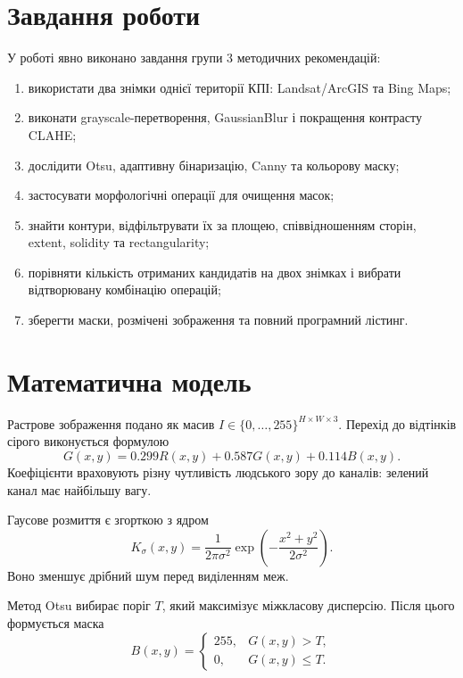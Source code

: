 \documentclass[12pt,a4paper]{article}
\begin{document}
\section{Завдання роботи}
У роботі явно виконано завдання групи 3 методичних рекомендацій:
\begin{enumerate}[leftmargin=*,itemsep=0.2em]
  \item використати два знімки однієї території КПІ: Landsat/ArcGIS та Bing Maps;
  \item виконати grayscale-перетворення, GaussianBlur і покращення контрасту CLAHE;
  \item дослідити Otsu, адаптивну бінаризацію, Canny та кольорову маску;
  \item застосувати морфологічні операції для очищення масок;
  \item знайти контури, відфільтрувати їх за площею, співвідношенням сторін, extent, solidity та rectangularity;
  \item порівняти кількість отриманих кандидатів на двох знімках і вибрати відтворювану комбінацію операцій;
  \item зберегти маски, розмічені зображення та повний програмний лістинг.
\end{enumerate}

\section{Математична модель}
Растрове зображення подано як масив \(I\in\{0,\ldots,255\}^{H\times W\times3}\). Перехід до відтінків сірого виконується формулою
\begin{equation}
G(x,y)=0.299R(x,y)+0.587G(x,y)+0.114B(x,y).
\end{equation}
Коефіцієнти враховують різну чутливість людського зору до каналів: зелений канал має найбільшу вагу.

Гаусове розмиття є згорткою з ядром
\begin{equation}
K_\sigma(x,y)=\frac{1}{2\pi\sigma^2}\exp\left(-\frac{x^2+y^2}{2\sigma^2}\right).
\end{equation}
Воно зменшує дрібний шум перед виділенням меж.

Метод Otsu вибирає поріг \(T\), який максимізує міжкласову дисперсію. Після цього формується маска
\begin{equation}
B(x,y)=\begin{cases}255,&G(x,y)>T,\\0,&G(x,y)\leq T.\end{cases}
\end{equation}
\end{document}
